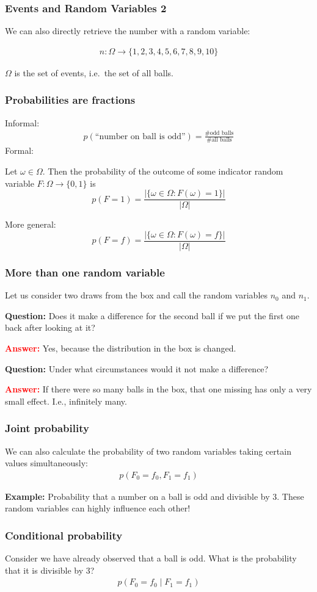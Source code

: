 \documentclass[USenglish,pdftex,compress,10pt,svgnamesi,handout]{beamer}
\newcommand{\eq}[1]{\begin{align*}#1\end{align*}}
\newcommand{\exmpl}[1]{\par{\textbf{Example:}} #1}
\newcommand{\question}[1]{\par{\textbf{Question:}} #1}
\newcommand{\answer}[1]{\par{\textcolor{red}{\textbf{Answer:}}} #1}
\begin{document}
\begin{frame}
\frametitle{Events and Random Variables 2}

We can also directly retrieve the number with a random variable:

\eq{
    n: \Omega \rightarrow \{1, 2, 3, 4, 5, 6, 7, 8, 9, 10\}
}

$\Omega$ is the set of events, i.e.\ the set of all balls.
\end{frame}


\begin{frame}
\frametitle{Probabilities are fractions}
Informal:
\eq{
    p(\text{``number on ball is odd''}) 
        = \frac{\#\text{odd balls}}{\#\text{all balls}}
}
\pause
\medskip
Formal: 

Let $\omega \in \Omega$. 
Then the probability of the outcome of some indicator random variable $F: \Omega \rightarrow \{0, 1\}$ is 
$$
    p(F=1) = \frac{|\{\omega \in \Omega: F(\omega) = 1\}|}{|\Omega|}
$$

\pause
\medskip
More general:
$$
    p(F=f) = \frac{|\{\omega \in \Omega: F(\omega) = f\}|}{|\Omega|}
$$
\end{frame}


\begin{frame}
\frametitle{More than one random variable}
Let us consider two draws from the box and call the random variables $n_0$ and $n_1$.

\medskip

\question{Does it make a difference for the second ball if we put the first one back after looking at it?}
\pause
\answer{Yes, because the distribution in the box is changed.}

\question{Under what circumstances would it not make a difference?}
\pause
\answer{If there were so many balls in the box, that one missing has only a very small effect. I.e., infinitely many.}
\end{frame}


\begin{frame}
\frametitle{Joint probability}
We can also calculate the probability of two random variables taking certain values simultaneously:
\eq{p(F_0=f_0, F_1=f_1)}
\exmpl{Probability that a number on a ball is odd and divisible by 3.}
These random variables can highly influence each other!
\end{frame}

\begin{frame}
\frametitle{Conditional probability}
Consider we have already observed that a ball is odd.
What is the probability that it is divisible by 3?
\eq{p(F_0=f_0\mid F_1=f_1)}
\end{frame}
\end{document}
